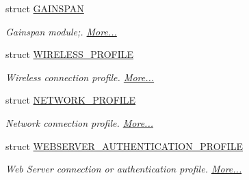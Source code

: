 \begin{DoxyCompactItemize}
struct \hyperlink{group__wireless__interface_struct_g_a_i_n_s_p_a_n}{G\+A\+I\+N\+S\+P\+AN}
\begin{DoxyCompactList}\small\item\em Gainspan module;.  \hyperlink{group__wireless__interface_struct_g_a_i_n_s_p_a_n}{More...}\end{DoxyCompactList}\item 
struct \hyperlink{group__wireless__interface_struct_w_i_r_e_l_e_s_s___p_r_o_f_i_l_e}{W\+I\+R\+E\+L\+E\+S\+S\+\_\+\+P\+R\+O\+F\+I\+LE}
\begin{DoxyCompactList}\small\item\em Wireless connection profile.  \hyperlink{group__wireless__interface_struct_w_i_r_e_l_e_s_s___p_r_o_f_i_l_e}{More...}\end{DoxyCompactList}\item 
struct \hyperlink{group__wireless__interface_struct_n_e_t_w_o_r_k___p_r_o_f_i_l_e}{N\+E\+T\+W\+O\+R\+K\+\_\+\+P\+R\+O\+F\+I\+LE}
\begin{DoxyCompactList}\small\item\em Network connection profile.  \hyperlink{group__wireless__interface_struct_n_e_t_w_o_r_k___p_r_o_f_i_l_e}{More...}\end{DoxyCompactList}\item 
struct \hyperlink{group__wireless__interface_struct_w_e_b_s_e_r_v_e_r___a_u_t_h_e_n_t_i_c_a_t_i_o_n___p_r_o_f_i_l_e}{W\+E\+B\+S\+E\+R\+V\+E\+R\+\_\+\+A\+U\+T\+H\+E\+N\+T\+I\+C\+A\+T\+I\+O\+N\+\_\+\+P\+R\+O\+F\+I\+LE}
\begin{DoxyCompactList}\small\item\em Web Server connection or authentication profile.  \hyperlink{group__wireless__interface_struct_w_e_b_s_e_r_v_e_r___a_u_t_h_e_n_t_i_c_a_t_i_o_n___p_r_o_f_i_l_e}{More...}\end{DoxyCompactList}\end{DoxyCompactItemize}
